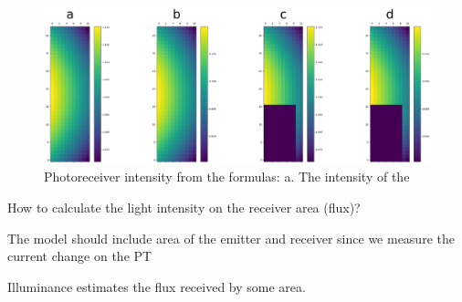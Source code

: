 \begin{figure}[H]
    \includegraphics[width=1\textwidth]{figs/intensity_output.png}
      \centering
      \caption{Photoreceiver intensity from the formulas: a. The intensity of the }
      \label{fig:intensity_output}
    \end{figure}
    

How to calculate the light intensity on the receiver area (flux)?

The model should include area of the emitter and receiver since we measure the current change on the PT

Illuminance estimates the flux received by some area. 








